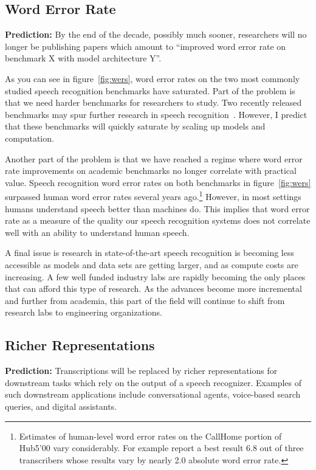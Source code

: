 \subsection{Word Error Rate}
\label{sec:wer}

{\bf Prediction:} By the end of the decade, possibly much sooner, researchers
will no longer be publishing papers which amount to ``improved word error rate
on benchmark X with model architecture Y''.

As you can see in figure~\ref{fig:wers}, word error rates on the two most
commonly studied speech recognition benchmarks have saturated. Part of the
problem is that we need harder benchmarks for researchers to study.  Two
recently released benchmarks may spur further research in speech
recognition~\citep{chen2021gigaspeech, galvez2021people}. However, I predict
that these benchmarks will quickly saturate by scaling up models and
computation.

Another part of the problem is that we have reached a regime where word error
rate improvements on academic benchmarks no longer correlate with practical
value. Speech recognition word error rates on both benchmarks in
figure~\ref{fig:wers} surpassed human word error rates several years
ago.\footnote{Estimates of human-level word error rates on the CallHome portion
of Hub5'00 vary considerably. For example \citet{saon2017english} report a best
result 6.8 out of three transcribers whose results vary by nearly 2.0 absolute
word error rate.} However, in most settings humans understand speech better
than machines do. This implies that word error rate as a measure of the quality
our speech recognition systems does not correlate well with an ability to
understand human speech.

A final issue is research in state-of-the-art speech recognition is becoming
less accessible as models and data sets are getting larger, and as compute
costs are increasing. A few well funded industry labs are rapidly becoming the
only places that can afford this type of research. As the advances become more
incremental and further from academia, this part of the field will continue to
shift from research labs to engineering organizations.

\subsection{Richer Representations}

{\bf Prediction:} Transcriptions will be replaced by richer representations for
downstream tasks which rely on the output of a speech recognizer. Examples of
such downstream applications include conversational agents, voice-based search
queries, and digital assistants.

